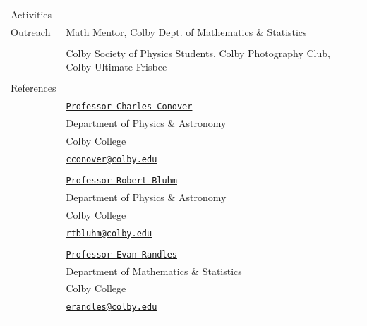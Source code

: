 \documentclass[10pt]{article}
\begin{document}
\begin{longtable}{ l m{13.5cm}   }
  \large{Activities}    & \\ 
  \large{Outreach}		& Math Mentor, Colby Dept. of Mathematics \& Statistics \\
  						& \\
  						& Colby Society of Physics Students, Colby Photography Club, Colby Ultimate Frisbee \\
     					& \\

\newpage

  \large{References}	& \\
  						& \href{https://www.colby.edu/directory/profile/charles.conover/}{\texttt{Professor Charles Conover}} \\
  						& Department of Physics \& Astronomy \\
  						& Colby College \\
  						& {\href{mailto:cconover@colby.edu}{\texttt{cconover@colby.edu}}}\\
  						& \\
  						
  						& \href{http://www.colby.edu/physics/faculty/robert.html}{\texttt{Professor Robert Bluhm}} \\
  						& Department of Physics \& Astronomy \\
  						& Colby College \\
  						& {\href{mailto:rtbluhm@colby.edu}{\texttt{rtbluhm@colby.edu}}} \\
  						&  \\
  						
  						& \href{https://personal.colby.edu/~erandles/}{\texttt{Professor Evan Randles}} \\
  						& Department of Mathematics \& Statistics \\
  						& Colby College \\
  						& {\href{mailto:erandles@colby.edu}{\texttt{erandles@colby.edu}}} \\
  						& \\
  						
  						
  
  
\end{longtable}
\end{document}
